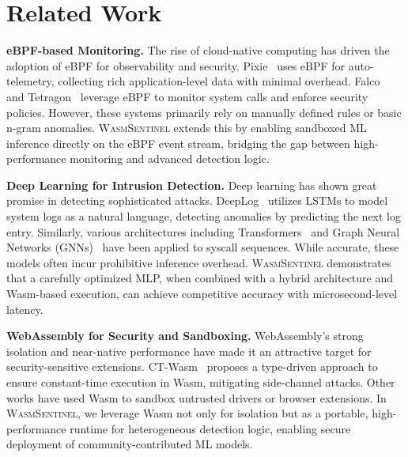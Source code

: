 \section{Related Work}
\label{sec:related-work}

\textbf{eBPF-based Monitoring.}
The rise of cloud-native computing has driven the adoption of eBPF for observability and security.
Pixie~\cite{pixie} uses eBPF for auto-telemetry, collecting rich application-level data with minimal overhead.
Falco~\cite{falco} and Tetragon~\cite{tetragon} leverage eBPF to monitor system calls and enforce security policies.
However, these systems primarily rely on manually defined rules or basic n-gram anomalies.
\textsc{WasmSentinel} extends this by enabling sandboxed ML inference directly on the eBPF event stream, bridging the gap between high-performance monitoring and advanced detection logic.

\textbf{Deep Learning for Intrusion Detection.}
Deep learning has shown great promise in detecting sophisticated attacks.
DeepLog~\cite{deeplog} utilizes LSTMs to model system logs as a natural language, detecting anomalies by predicting the next log entry.
Similarly, various architectures including Transformers~\cite{transformer-sec} and Graph Neural Networks (GNNs)~\cite{gnn-sec} have been applied to syscall sequences.
While accurate, these models often incur prohibitive inference overhead.
\textsc{WasmSentinel} demonstrates that a carefully optimized MLP, when combined with a hybrid architecture and Wasm-based execution, can achieve competitive accuracy with microsecond-level latency.

\textbf{WebAssembly for Security and Sandboxing.}
WebAssembly's strong isolation and near-native performance have made it an attractive target for security-sensitive extensions.
CT-Wasm~\cite{ct-wasm} proposes a type-driven approach to ensure constant-time execution in Wasm, mitigating side-channel attacks.
Other works have used Wasm to sandbox untrusted drivers or browser extensions.
In \textsc{WasmSentinel}, we leverage Wasm not only for isolation but as a portable, high-performance runtime for heterogeneous detection logic, enabling secure deployment of community-contributed ML models.
